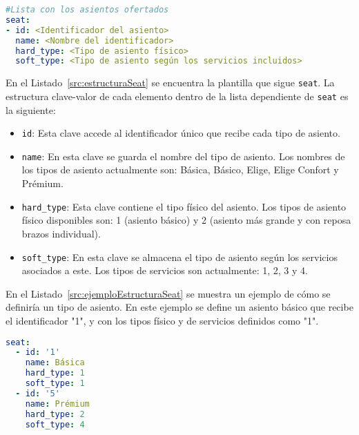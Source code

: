 \begin{lstlisting}[language=YAML,
                   frame=none,
                   numbers=none,
                   basicstyle=\ttfamily\normalsize,
                   caption={Estructura de la clave raíz \texttt{seat}},
                   label=src:estructuraSeat,
                   inputencoding=utf8]
#Lista con los asientos ofertados
seat:
- id: <Identificador del asiento>
  name: <Nombre del identificador>
  hard_type: <Tipo de asiento físico>
  soft_type: <Tipo de asiento según los servicios incluidos> 
\end{lstlisting}

En el Listado~\ref{src:estructuraSeat} se encuentra la plantilla que sigue \texttt{seat}. La estructura clave-valor de cada elemento dentro de la lista dependiente de \texttt{seat} es la siguiente:

\begin{itemize}
    \item \texttt{id}: Esta clave accede al identificador único que recibe cada tipo de asiento.
    \item \texttt{name}: En esta clave se guarda el nombre del tipo de asiento. Los nombres de los tipos de asiento actualmente son: Básica, Básico, Elige, Elige Confort y Prémium.
    \item \texttt{hard\_type}: Esta clave contiene el tipo físico del asiento. Los tipos de asiento físico disponibles son: 1 (asiento básico) y 2 (asiento más grande y con reposa brazos individual).
    \item \texttt{soft\_type}: En esta clave se almacena el tipo de asiento según los servicios asociados a este. Los tipos de servicios son actualmente: 1, 2, 3 y 4.
\end{itemize}

En el Listado~\ref{src:ejemploEstructuraSeat} se muestra un ejemplo de cómo se definiría un tipo de asiento. En este ejemplo se define un asiento básico que recibe el identificador "1", y con los tipos físico y de servicios definidos como "1". 

\begin{lstlisting}[language=YAML,
                   frame=none,
                   numbers=none,
                   basicstyle=\ttfamily\normalsize,
                   caption={Ejemplo con datos reales de la estructura de \texttt{seat}},
                   label=src:ejemploEstructuraSeat,
                   inputencoding=utf8]
seat:
  - id: '1'
    name: Básica
    hard_type: 1
    soft_type: 1
  - id: '5'
    name: Prémium
    hard_type: 2
    soft_type: 4
\end{lstlisting}

